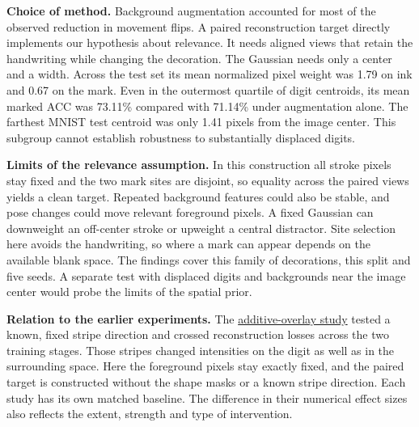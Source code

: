 \textbf{Choice of method.} Background augmentation accounted for most of the observed reduction in movement flips. A paired reconstruction target directly implements our hypothesis about relevance. It needs aligned views that retain the handwriting while changing the decoration. The Gaussian needs only a center and a width. Across the test set its mean normalized pixel weight was 1.79 on ink and 0.67 on the mark. Even in the outermost quartile of digit centroids, its mean marked ACC was 73.11\% compared with 71.14\% under augmentation alone. The farthest MNIST test centroid was only 1.41 pixels from the image center. This subgroup cannot establish robustness to substantially displaced digits.

\textbf{Limits of the relevance assumption.} In this construction all stroke pixels stay fixed and the two mark sites are disjoint, so equality across the paired views yields a clean target. Repeated background features could also be stable, and pose changes could move relevant foreground pixels. A fixed Gaussian can downweight an off-center stroke or upweight a central distractor. Site selection here avoids the handwriting, so where a mark can appear depends on the available blank space. The findings cover this family of decorations, this split and five seeds. A separate test with displaced digits and backgrounds near the image center would probe the limits of the spatial prior.

\textbf{Relation to the earlier experiments.} The \href{https://github.com/JohnR31N/cs126FinalProj/blob/idec-final-v1.4/IDEC/report/report.pdf}{additive-overlay study} tested a known, fixed stripe direction and crossed reconstruction losses across the two training stages. Those stripes changed intensities on the digit as well as in the surrounding space. Here the foreground pixels stay exactly fixed, and the paired target is constructed without the shape masks or a known stripe direction. Each study has its own matched baseline. The difference in their numerical effect sizes also reflects the extent, strength and type of intervention.

